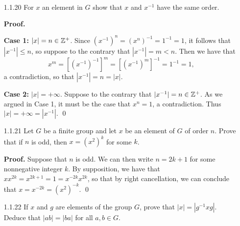 \begin{enumerate}
\begin{enumerate}
               \textbf{Case 3:} \textit{$a$ is negative and $b$ is positive}. 
               Thus
               \begin{align*}
                  (x^a)^b &= [x^{-(-a)}]^b \\
                          &= [(x^{-1})^{-a}]^b &[\text{Definition}] \\
                          &= (x^{-1})^{-ab} &[\text{Case 1}] \\
                          &= x^{-(-ab)} &[\text{Definition}] \\
                          &= x^{ab}.
               \end{align*}

               Combining these results with part (a), we can conclude that
               $(x^a)^b = x^{ab}$ holds for all integers $a$ and $b$ and
               $x \in G$. \qed
      \end{enumerate}
   \item[1.1.20]  For $x$ an element in $G$ show that $x$ and $x^{-1}$ have the
                  same order.

      \textbf{Proof.}

      \textbf{Case 1:} \textit{$|x| = n \in \mathbb{Z}^+$}. Since
      $(x^{-1})^n = (x^n)^{-1} = 1^{-1} = 1$, it follows that $|x^{-1}| \le n$,
      so suppose to the contrary that $|x^{-1}| = m < n$. Then we have that
      $$x^m = [(x^{-1})^{-1}]^m = [(x^{-1})^m]^{-1} = 1^{-1} = 1,$$
      a contradiction, so that $|x^{-1}| = n = |x|$.

      \textbf{Case 2:} \textit{$|x| = +\infty$}. Suppose to the contrary that
      $|x^{-1}| = n \in \mathbb{Z}^+$. As we argued in Case 1, it must be the case that
      $x^n = 1$, a contradiction. Thus $|x| = +\infty = |x^{-1}|$. \qed
   \item[1.1.21]  Let $G$ be a finite group and let $x$ be an element of $G$ of
                  order $n$. Prove that if $n$ is odd, then $x = (x^2)^k$ for
                  some $k$.

      \textbf{Proof.} Suppose that $n$ is odd. We can then write $n = 2k + 1$
      for some nonnegative integer $k$. By supposition, we have that
      $xx^{2k} = x^{2k+1} = 1 = x^{-2k}x^{2k}$, so that by right cancellation,
      we can conclude that $x = x^{-2k} = (x^2)^{-k}$. \qed
   \item[1.1.22]  If $x$ and $g$ are elements of the group $G$, prove that
                  $|x| = |g^{-1}xg|$. Deduce that $|ab| = |ba|$ for all
                  $a, b \in G$.


\end{enumerate}
